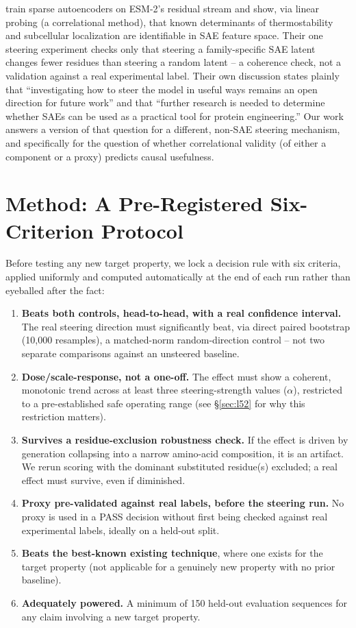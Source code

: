 \documentclass{article}
\begin{document}
\citet{adams2025mechanistic} train sparse autoencoders on ESM-2's
residual stream and show, via linear probing (a correlational method),
that known determinants of thermostability and subcellular localization
are identifiable in SAE feature space. Their one steering experiment
checks only that steering a family-specific SAE latent changes fewer
residues than steering a random latent -- a coherence check, not a
validation against a real experimental label. Their own discussion
states plainly that ``investigating how to steer the model in useful
ways remains an open direction for future work'' and that ``further
research is needed to determine whether SAEs can be used as a practical
tool for protein engineering.'' Our work answers a version of that
question for a different, non-SAE steering mechanism, and specifically
for the question of whether correlational validity (of either a
component or a proxy) predicts causal usefulness.

\section{Method: A Pre-Registered Six-Criterion Protocol}
\label{sec:method}

Before testing any new target property, we lock a decision rule with six
criteria, applied uniformly and computed automatically at the end of
each run rather than eyeballed after the fact:

\begin{enumerate}
\item \textbf{Beats both controls, head-to-head, with a real confidence
  interval.} The real steering direction must significantly beat, via
  direct paired bootstrap (10{,}000 resamples), a matched-norm
  random-direction control -- not two separate comparisons against an
  unsteered baseline.
\item \textbf{Dose/scale-response, not a one-off.} The effect must show
  a coherent, monotonic trend across at least three steering-strength
  values ($\alpha$), restricted to a pre-established safe operating
  range (see \S\ref{sec:l52} for why this restriction matters).
\item \textbf{Survives a residue-exclusion robustness check.} If the
  effect is driven by generation collapsing into a narrow amino-acid
  composition, it is an artifact. We rerun scoring with the dominant
  substituted residue(s) excluded; a real effect must survive, even if
  diminished.
\item \textbf{Proxy pre-validated against real labels, before the
  steering run.} No proxy is used in a PASS decision without first
  being checked against real experimental labels, ideally on a held-out
  split.
\item \textbf{Beats the best-known existing technique}, where one
  exists for the target property (not applicable for a genuinely new
  property with no prior baseline).
\item \textbf{Adequately powered.} A minimum of 150 held-out evaluation
  sequences for any claim involving a new target property.
\end{enumerate}
\end{document}
